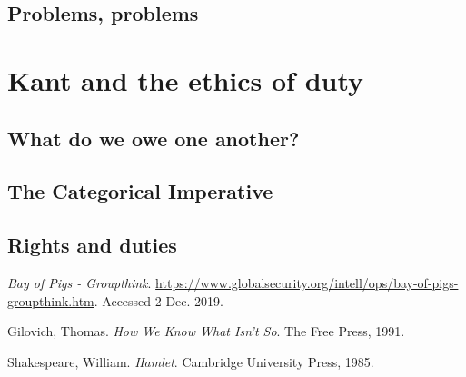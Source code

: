 \documentclass[justified]{tufte-book}
\begin{document}
\hypertarget{problems-problems}{%
\section{Problems, problems}\label{problems-problems}}

\hypertarget{kant-and-the-ethics-of-duty}{%
\chapter{Kant and the ethics of duty}\label{kant-and-the-ethics-of-duty}}

\hypertarget{what-do-we-owe-one-another}{%
\section{What do we owe one another?}\label{what-do-we-owe-one-another}}

\hypertarget{the-categorical-imperative}{%
\section{The Categorical Imperative}\label{the-categorical-imperative}}

\hypertarget{rights-and-duties}{%
\section{Rights and duties}\label{rights-and-duties}}

\hypertarget{refs}{}
\leavevmode\hypertarget{ref-BayPigsGroupthink}{}%
\emph{Bay of Pigs - Groupthink}. \url{https://www.globalsecurity.org/intell/ops/bay-of-pigs-groupthink.htm}. Accessed 2 Dec. 2019.

\leavevmode\hypertarget{ref-gilovichHowWeKnow1991}{}%
Gilovich, Thomas. \emph{How We Know What Isn't So}. The Free Press, 1991.

\leavevmode\hypertarget{ref-shakespeareHamlet1985}{}%
Shakespeare, William. \emph{Hamlet}. Cambridge University Press, 1985.
\end{document}
